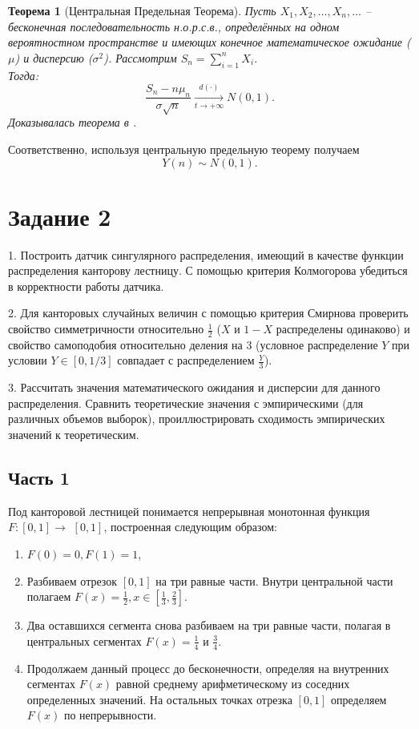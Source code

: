 \documentclass[11pt]{article}
\newtheorem{theorem}{Теорема}[section]
\begin{document}
\begin{theorem}[Центральная Предельная Теорема]
 Пусть $X_1,X_2,\ldots,X_n,\ldots$ – бесконечная последовательность н.о.р.с.в., определённых на одном вероятностном пространстве и имеющих конечное математическое ожидание ($\mu$) и дисперсию ($\sigma^2$). Рассмотрим $S_n = \sum_{i=1}^n X_i $. \\
 Тогда:
$$
 \frac{S_n - n \mu_n}{\sigma \sqrt{n}} \underset{t \to +\infty}{\overset{d(\cdot)}{\rightarrow}} N(0, 1).
$$
  Доказывалась теорема в \cite{2}.
\end{theorem}

Соответственно, используя центральную предельную теорему получаем
$$
    Y(n) \sim N(0, 1).
$$


\section{Задание 2}

1. Построить датчик сингулярного распределения, имеющий в качестве функции распределения канторову лестницу. 
С помощью критерия Колмогорова убедиться в корректности работы датчика.

2.  Для канторовых случайных величин с помощью критерия Смирнова проверить
свойство симметричности относительно $\frac{1}{2}$ ($X$ и $1 - X$ распределены одинаково)
и свойство самоподобия относительно деления на $3$ (условное распределение $Y$
при условии $Y \in [0, 1/3]$ совпадает с распределением $\frac{Y}{3}$).

3. Рассчитать значения математического ожидания и дисперсии для данного распределения. Сравнить теоретические значения с эмпирическими (для различных объемов выборок), проиллюстрировать сходимость эмпирических значений к теоретическим.

\subsection{Часть 1}
Под канторовой лестницей понимается непрерывная монотонная функция \\
$F:[0,1] \rightarrow$ $[0,1]$, построенная следующим образом:

 \begin{enumerate}
  \item $F(0)=0, F(1)=1$,
  \item Разбиваем отрезок $[0,1]$ на три равные части. Внутри центральной части полагаем $F(x)=\frac{1}{2}, x \in\left[\frac{1}{3}, \frac{2}{3}\right]$.
  \item Два оставшихся сегмента снова разбиваем на три равные части, полагая в центральных сегментах $F(x)=\frac{1}{4}$ и $\frac{3}{4}$.
  \item Продолжаем данный процесс до бесконечности, определяя на внутренних сегментах $F(x)$ равной среднему арифметическому из соседних определенных значений. На остальных точках отрезка $[0,1]$ определяем $F(x)$ по непрерывности.
 \end{enumerate}
\end{document}
